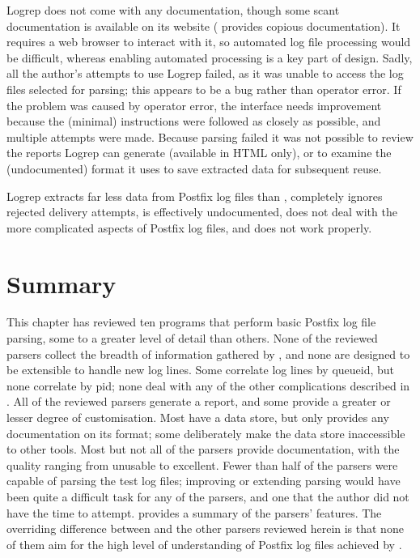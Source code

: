 Logrep does not come with any documentation, though some scant
documentation is available on its website (\parsername{} provides copious
documentation).  It requires a web browser to interact with it, so
automated log file processing would be difficult, whereas enabling
automated processing is a key part of \parsernames{} design.  Sadly, all
the author's attempts to use Logrep failed, as it was unable to access the
log files selected for parsing; this appears to be a bug rather than
operator error.  If the problem was caused by operator error, the interface
needs improvement because the (minimal) instructions were followed as
closely as possible, and multiple attempts were made.  Because parsing
failed it was not possible to review the reports Logrep can generate
(available in HTML only), or to examine the (undocumented) format it uses
to save extracted data for subsequent reuse.

Logrep extracts far less data from Postfix log files than \parsername{},
completely ignores rejected delivery attempts, is effectively undocumented,
does not deal with the more complicated aspects of Postfix log files, and
does not work properly.

\section{Summary}

This chapter has reviewed ten programs that perform basic Postfix log file
parsing, some to a greater level of detail than others.  None of the
reviewed parsers collect the breadth of information gathered by
\parsername{}, and none are designed to be extensible to handle new log
lines.  Some correlate log lines by queueid, but none correlate by pid;
none deal with any of the other complications described in
.  All of the reviewed parsers generate a
report, and some provide a greater or lesser degree of customisation.  Most
have a data store, but only  provides any documentation on its
format; some deliberately make the data store inaccessible to other tools.
Most but not all of the parsers provide documentation, with the quality
ranging from unusable to excellent.  Fewer than half of the parsers were
capable of parsing the \numberOFlogFILES{} test log files; improving or
extending parsing would have been quite a difficult task for any of the
parsers, and one that the author did not have the time to attempt.
 provides a summary of the parsers'
features.  The overriding difference between \parsername{} and the other
parsers reviewed herein is that none of them aim for the high level of
understanding of Postfix log files achieved by \parsername{}.


